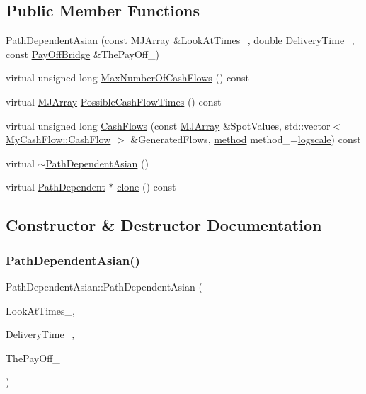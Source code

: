 \subsection*{Public Member Functions}
\begin{DoxyCompactItemize}
\item 
\hyperlink{classPathDependentAsian_a8fc1e68fdba8e7815a19f5991fc40b36}{Path\+Dependent\+Asian} (const \hyperlink{classMJArray}{M\+J\+Array} \&Look\+At\+Times\+\_\+, double Delivery\+Time\+\_\+, const \hyperlink{classPayOffBridge}{Pay\+Off\+Bridge} \&The\+Pay\+Off\+\_\+)
\item 
virtual unsigned long \hyperlink{classPathDependentAsian_af11d1140df3f2ab8e9f9ccc5f3eb4d73}{Max\+Number\+Of\+Cash\+Flows} () const
\item 
virtual \hyperlink{classMJArray}{M\+J\+Array} \hyperlink{classPathDependentAsian_a58d4f5ddfc26c3c8eeefddd3834525f6}{Possible\+Cash\+Flow\+Times} () const
\item 
virtual unsigned long \hyperlink{classPathDependentAsian_a404a8456848eff0edc780f2ca05ad856}{Cash\+Flows} (const \hyperlink{classMJArray}{M\+J\+Array} \&Spot\+Values, std\+::vector$<$ \hyperlink{classMyCashFlow_1_1CashFlow}{My\+Cash\+Flow\+::\+Cash\+Flow} $>$ \&Generated\+Flows, \hyperlink{PathDependent_8h_abed946c62f140eb7ff2ac742e6ad9497}{method} method\+\_\+=\hyperlink{PathDependent_8h_abed946c62f140eb7ff2ac742e6ad9497a064d3d3358889658ce07fe9f3191d1fd}{logscale}) const
\item 
virtual \hyperlink{classPathDependentAsian_acbd679e3574b509d6fcf36eba8227769}{$\sim$\+Path\+Dependent\+Asian} ()
\item 
virtual \hyperlink{classPathDependent}{Path\+Dependent} $\ast$ \hyperlink{classPathDependentAsian_a39a39fccbdf2ea9aad07ad8152b768d5}{clone} () const
\end{DoxyCompactItemize}


\subsection{Constructor \& Destructor Documentation}
\hypertarget{classPathDependentAsian_a8fc1e68fdba8e7815a19f5991fc40b36}{}\label{classPathDependentAsian_a8fc1e68fdba8e7815a19f5991fc40b36} 
\subsubsection{\texorpdfstring{Path\+Dependent\+Asian()}{PathDependentAsian()}}
{\footnotesize\ttfamily Path\+Dependent\+Asian\+::\+Path\+Dependent\+Asian (\begin{DoxyParamCaption}\item[{const \hyperlink{classMJArray}{M\+J\+Array} \&}]{Look\+At\+Times\+\_\+,  }\item[{double}]{Delivery\+Time\+\_\+,  }\item[{const \hyperlink{classPayOffBridge}{Pay\+Off\+Bridge} \&}]{The\+Pay\+Off\+\_\+ }\end{DoxyParamCaption})}

